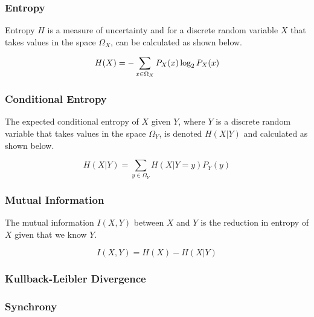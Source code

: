 \documentclass[a4paper,11pt]{article}
\begin{document}
\subsubsection{Entropy}
\label{sec:bg:entropy}

Entropy $H$ is a measure of uncertainty and for a discrete random variable $X$ that takes values in the space $\Omega_X$, can be calculated as shown below.

\begin{equation} \label{eq:entropy}
H(X) = - \sum_{x \in \Omega_X}P_X(x) \log_2 P_X(x)\\[2.5mm]
\end{equation}

\subsubsection{Conditional Entropy}
\label{sec:bg:cond-entropy}

The expected conditional entropy of $X$ given $Y$, where $Y$ is a discrete random variable that takes values in the space $\Omega_Y$, is denoted $H(X|Y)$ and calculated as shown below.

\begin{equation} \label{eq:cond-entropy}
H(X|Y) = \sum_{y \in \Omega_Y}H(X|Y=y)P_Y(y)
\end{equation}

\subsubsection{Mutual Information}
\label{sec:bg:mi}

The mutual information $I(X,Y)$ between $X$ and $Y$ is the reduction in entropy of $X$ given that we know $Y$.

\begin{equation} \label{eq:mi}
I(X,Y) = H(X) - H(X|Y)
\end{equation}

\subsubsection{Kullback-Leibler Divergence}
\label{sec:bg:cond-kld}

\subsubsection{Synchrony}
\label{sec:bg:sync}
\end{document}

